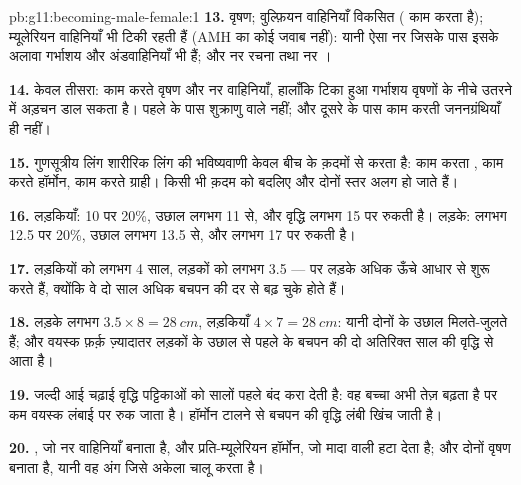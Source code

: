 \begin{solution}{pb:g11:becoming-male-female:1}
\textbf{13.} वृषण; वुल्फ़ियन वाहिनियाँ विकसित ( काम करता है);
म्यूलेरियन वाहिनियाँ भी टिकी रहती हैं (AMH का कोई जवाब नहीं): यानी ऐसा नर
जिसके पास इसके अलावा गर्भाशय और अंडवाहिनियाँ भी हैं; और नर रचना तथा नर
।

\textbf{14.} केवल तीसरा: काम करते वृषण और नर वाहिनियाँ, हालाँकि टिका हुआ
गर्भाशय वृषणों के नीचे उतरने में अड़चन डाल सकता है। पहले के पास शुक्राणु
वाले  नहीं; और दूसरे के पास काम करती जननग्रंथियाँ ही नहीं।

\textbf{15.} गुणसूत्रीय लिंग शारीरिक लिंग की भविष्यवाणी केवल बीच के क़दमों
से करता है: काम करता , काम करते हॉर्मोन, काम करते ग्राही। किसी भी क़दम
को बदलिए और दोनों स्तर अलग हो जाते हैं।

\textbf{16.} लड़कियाँ: 10 पर 20\%, उछाल लगभग 11 से, और वृद्धि लगभग 15 पर
रुकती है। लड़के: लगभग 12.5 पर 20\%, उछाल लगभग 13.5 से, और लगभग 17 पर
रुकती है।

\textbf{17.} लड़कियों को लगभग 4 साल, लड़कों को लगभग 3.5 --- पर लड़के अधिक
ऊँचे आधार से शुरू करते हैं, क्योंकि वे दो साल अधिक बचपन की दर से बढ़ चुके
होते हैं।

\textbf{18.} लड़के लगभग $3.5 \times 8 = \qty{28}{cm}$, लड़कियाँ $4 \times
7 = \qty{28}{cm}$: यानी दोनों के उछाल मिलते-जुलते हैं; और वयस्क फ़र्क़
ज़्यादातर लड़कों के उछाल से पहले के बचपन की दो अतिरिक्त साल की वृद्धि से
आता है।

\textbf{19.} जल्दी आई चढ़ाई वृद्धि पट्टिकाओं को सालों पहले बंद करा देती
है: वह बच्चा अभी तेज़ बढ़ता है पर कम वयस्क लंबाई पर रुक जाता है। हॉर्मोन
टालने से बचपन की वृद्धि लंबी खिंच जाती है।

\textbf{20.} , जो नर वाहिनियाँ बनाता है, और
प्रति-म्यूलेरियन हॉर्मोन, जो मादा वाली हटा देता है; और दोनों वृषण बनाता
है, यानी वह अंग जिसे अकेला   चालू करता है।
\end{solution}
